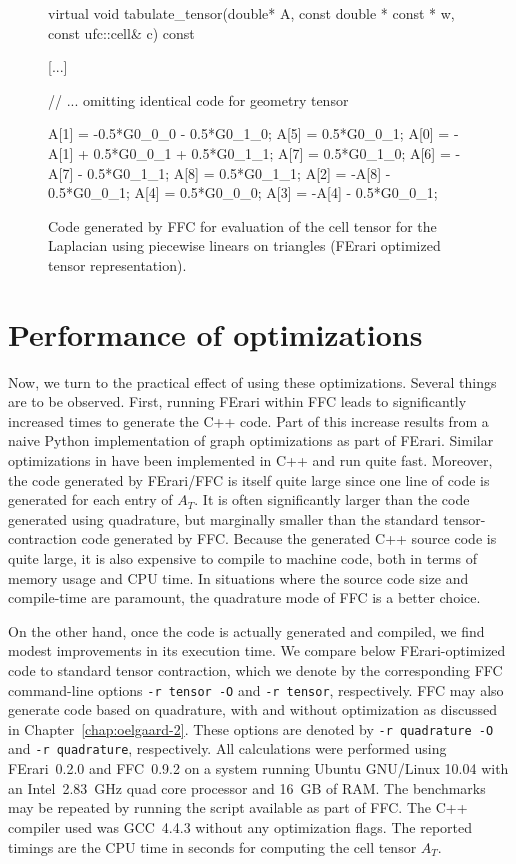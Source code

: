 \begin{figure}
\bwfig
  \scriptsize
  \begin{c++}
virtual void tabulate_tensor(double* A,
                             const double * const * w,
                             const ufc::cell& c) const
{
  [...]

  // ... omitting identical code for geometry tensor

  A[1] = -0.5*G0_0_0 - 0.5*G0_1_0;
  A[5] = 0.5*G0_0_1;
  A[0] = -A[1] + 0.5*G0_0_1 + 0.5*G0_1_1;
  A[7] = 0.5*G0_1_0;
  A[6] = -A[7] - 0.5*G0_1_1;
  A[8] = 0.5*G0_1_1;
  A[2] = -A[8] - 0.5*G0_0_1;
  A[4] = 0.5*G0_0_0;
  A[3] = -A[4] - 0.5*G0_0_1;
}
  \end{c++}
  \caption{Code generated by FFC for evaluation of the cell tensor for
    the Laplacian using piecewise linears on triangles (FErari
    optimized tensor representation).}
  \label{fig:code,poisson,optimized}
\end{figure}

\section{Performance of optimizations}

Now, we turn to the practical effect of using these optimizations.
Several things are to be observed. First, running FErari within FFC
leads to significantly increased times to generate the C++ code. Part
of this increase results from a naive Python implementation of graph
optimizations as part of FErari. Similar optimizations
in \citet{WolfHeath2009} have been implemented in C++ and run quite
fast. Moreover, the code generated by FErari/FFC is itself quite large
since one line of code is generated for each entry of $A_T$. It is
often significantly larger than the code generated using quadrature,
but marginally smaller than the standard tensor-contraction code
generated by FFC. Because the generated C++ source code is quite
large, it is also expensive to compile to machine code, both in terms
of memory usage and CPU time. In situations where the source code size
and compile-time are paramount, the quadrature mode of FFC is a better
choice.

On the other hand, once the code is actually generated and compiled,
we find modest improvements in its execution time. We compare below
FErari-optimized code to standard tensor contraction, which we denote
by the corresponding FFC command-line options \texttt{-r tensor -O}
and \texttt{-r tensor}, respectively. FFC may also generate code based
on quadrature, with and without optimization as discussed in
Chapter~\ref{chap:oelgaard-2}. These options are denoted by \texttt{-r
  quadrature -O} and \texttt{-r quadrature}, respectively. All
calculations were performed using FErari~0.2.0 and FFC~0.9.2 on a
system running Ubuntu GNU/Linux 10.04 with an Intel~2.83~GHz quad core
processor and 16~GB of RAM. The benchmarks may be repeated by running
the script  available as part of FFC. The C++
compiler used was GCC~4.4.3 without any optimization flags. The
reported timings are the CPU time in seconds for computing the cell
tensor $A_T$.

